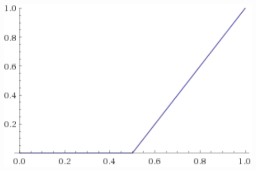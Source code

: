 \documentclass{beamer}
\begin{document}
\begin{frame}
\begin{columns}
\begin{minipage}[c][0.4\textheight][c]{\linewidth}
\end{minipage}
\begin{minipage}[c][0.4\textheight][c]{\linewidth}
  \centering
  \includegraphics[width=0.7\linewidth]{SS1-luka-diag}
\end{minipage}
\end{columns}
\end{frame}
\end{document}
